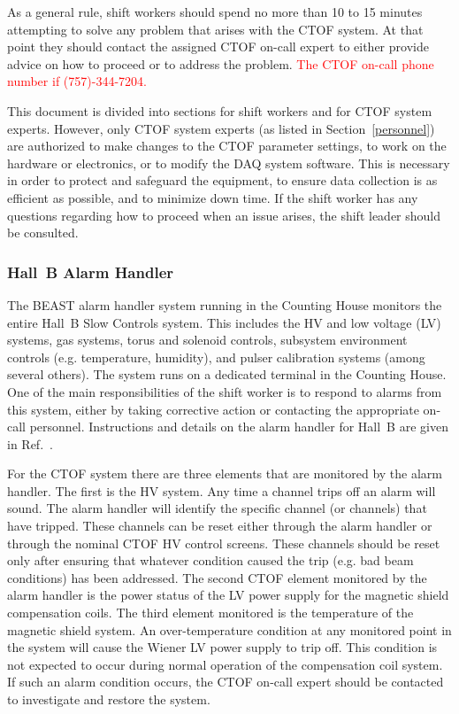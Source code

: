 \documentclass[12pt]{article}
\begin{document}
As a general rule, shift workers should spend no more than 10 to 15 minutes attempting to solve
any problem that arises with the CTOF system. At that point they should contact the assigned 
CTOF on-call expert to either provide advice on how to proceed or to address the problem.
\textcolor{red}{The CTOF on-call phone number if (757)-344-7204.}

This document is divided into sections for shift workers and for CTOF system experts. However, 
only CTOF system experts (as listed in Section~\ref{personnel}) are authorized to make changes 
to the CTOF parameter settings, to work on the hardware or electronics, or to modify the DAQ 
system software. This is necessary in order to protect and safeguard the equipment, to ensure 
data collection is as efficient as possible, and to minimize down time. If the shift worker has 
any questions regarding how to proceed when an issue arises, the shift leader should be consulted.

\subsubsection{Hall~B Alarm Handler}
\label{alarms}

The BEAST alarm handler system running in the Counting House monitors the entire Hall~B Slow 
Controls system. This includes the HV and low voltage (LV) systems, gas systems, torus and solenoid 
controls, subsystem environment controls (e.g. temperature, humidity), and pulser calibration 
systems (among several others). The system runs on a dedicated terminal in the Counting House. 
One of the main responsibilities of the shift worker is to respond to alarms from this system, 
either by taking corrective action or contacting the appropriate on-call personnel. Instructions 
and details on the alarm handler for Hall~B are given in Ref.~\cite{beast}.

For the CTOF system there are three elements that are monitored by the alarm handler. The first 
is the HV system. Any time a channel trips off an alarm will sound. The alarm handler will identify 
the specific channel (or channels) that have tripped. These channels can be reset either through 
the alarm handler or through the nominal CTOF HV control screens. These channels should be reset 
only after ensuring that whatever condition caused the trip (e.g. bad beam conditions) has been 
addressed. The second CTOF element monitored by the alarm handler is the power status of the LV
power supply for the magnetic shield compensation coils. The third element monitored is the 
temperature of the magnetic shield system. An over-temperature condition at any monitored point 
in the system will cause the Wiener LV power supply to trip off. This condition is not expected 
to occur during normal operation of the compensation coil system. If such an alarm condition 
occurs, the CTOF on-call expert should be contacted to investigate and restore the system.
\end{document}
